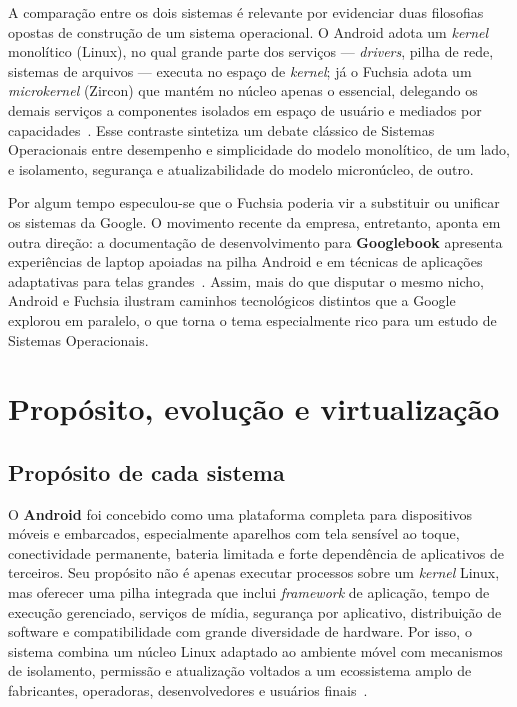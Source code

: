 \documentclass[12pt,a4paper]{article}
\begin{document}
A comparação entre os dois sistemas é relevante por evidenciar duas filosofias
opostas de construção de um sistema operacional. O Android adota um \emph{kernel}
monolítico (Linux), no qual grande parte dos serviços --- \emph{drivers}, pilha de
rede, sistemas de arquivos --- executa no espaço de \emph{kernel}; já o Fuchsia
adota um \emph{microkernel} (Zircon) que mantém no núcleo apenas o essencial,
delegando os demais serviços a componentes isolados em espaço de usuário e
mediados por capacidades~\cite{zircon,fuchsiawiki}. Esse contraste sintetiza um
debate clássico de Sistemas Operacionais entre desempenho e simplicidade do modelo
monolítico, de um lado, e isolamento, segurança e atualizabilidade do modelo
micronúcleo, de outro.

Por algum tempo especulou-se que o Fuchsia poderia vir a substituir ou unificar os
sistemas da Google. O movimento recente da empresa, entretanto, aponta em outra
direção: a documentação de desenvolvimento para \textbf{Googlebook} apresenta
experiências de laptop apoiadas na pilha Android e em técnicas de aplicações
adaptativas para telas grandes~\cite{googlebook}. Assim, mais do que disputar o
mesmo nicho, Android e Fuchsia ilustram caminhos tecnológicos distintos que a
Google explorou em paralelo, o que torna o tema especialmente rico para um estudo
de Sistemas Operacionais.

\section{Propósito, evolução e virtualização}
\label{sec:proposito}

\subsection{Propósito de cada sistema}

O \textbf{Android} foi concebido como uma plataforma completa para dispositivos
móveis e embarcados, especialmente aparelhos com tela sensível ao toque,
conectividade permanente, bateria limitada e forte dependência de aplicativos de
terceiros. Seu propósito não é apenas executar processos sobre um \emph{kernel}
Linux, mas oferecer uma pilha integrada que inclui \emph{framework} de aplicação,
tempo de execução gerenciado, serviços de mídia, segurança por aplicativo,
distribuição de software e compatibilidade com grande diversidade de hardware.
Por isso, o sistema combina um núcleo Linux adaptado ao ambiente móvel com
mecanismos de isolamento, permissão e atualização voltados a um ecossistema amplo
de fabricantes, operadoras, desenvolvedores e usuários finais~\cite{aosp,
aospkernel,androidsite}.
\end{document}
